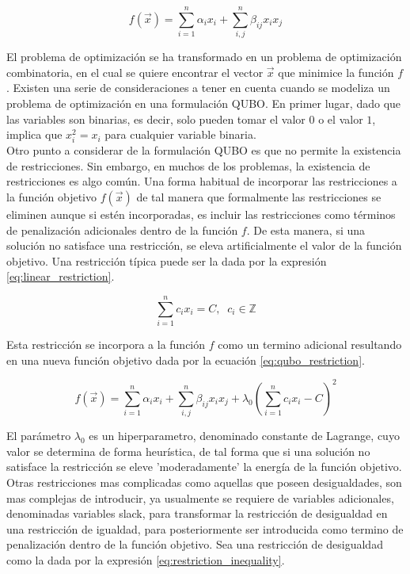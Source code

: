\begin{equation}
    f(\Vec{x}) = \sum_{i=1}^{n} \alpha_{i} x_{i} + \sum_{i,j}^{n} \beta_{ij} x_{i} x_{j}
    \label{eq:qubo}
\end{equation}


El problema de optimización se ha transformado en un problema de optimización combinatoria, en el cual se quiere encontrar el vector $\Vec{x}$ que minimice la función $f$. Existen una serie de consideraciones a tener en cuenta cuando se modeliza un problema de optimización en una formulación QUBO. En primer lugar, dado que las variables son binarias, es decir, solo pueden tomar el valor $0$ o el valor $1$, implica que $x_{i}^{2} = x_{i}$ para cualquier variable binaria. \\

Otro punto a considerar de la formulación QUBO es que no permite la existencia de restricciones. Sin embargo, en muchos de los problemas, la existencia de restricciones es algo común. Una forma habitual de incorporar las restricciones a la función objetivo $f(\Vec{x})$ de tal manera que formalmente las restricciones se eliminen aunque si estén incorporadas, es incluir las restricciones como términos de penalización adicionales dentro de la función $f$. De esta manera, si una solución no satisface una restricción, se eleva artificialmente el valor de la función objetivo. Una restricción típica puede ser la dada por la expresión \ref{eq:linear_restriction}.

\begin{equation}
    \sum_{i=1}^{n}c_ix_i = C, \; \; c_i \in \mathbb{Z} 
    \label{eq:linear_restriction}
\end{equation}

Esta restricción se incorpora a la función $f$ como un termino adicional resultando en una nueva función objetivo dada por la ecuación \ref{eq:qubo_restriction}.

\begin{equation}
    f(\Vec{x}) = \sum_{i=1}^{n} \alpha_{i} x_{i} + \sum_{i,j}^{n} \beta_{ij} x_{i} x_{j} + \lambda_0(\sum_{i=1}^n c_ix_i-C)^2
    \label{eq:qubo_restriction}
\end{equation}

El parámetro $\lambda_0$ es un hiperparametro, denominado constante de Lagrange, cuyo valor se determina de forma heurística, de tal forma que si una solución no satisface la restricción se eleve 'moderadamente' la energía de la función objetivo. Otras restricciones mas complicadas como aquellas que poseen desigualdades, son mas complejas de introducir, ya usualmente se requiere de variables adicionales, denominadas variables slack, para transformar la restricción de desigualdad en una restricción de igualdad, para posteriormente ser introducida como termino de penalización dentro de la función objetivo. Sea una restricción de desigualdad como la dada por la expresión \ref{eq:restriction_inequality}.


